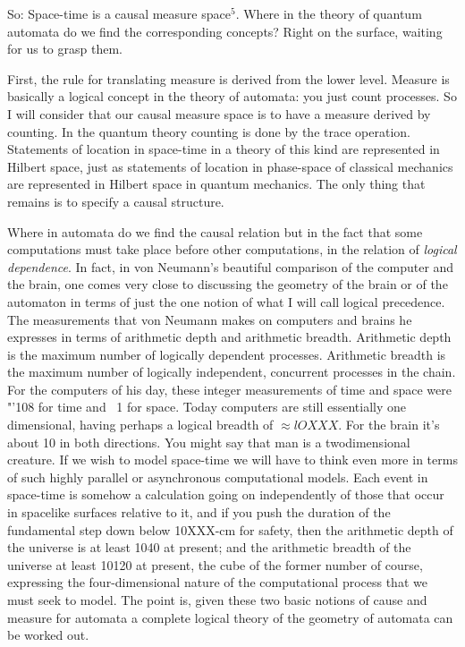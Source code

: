 So: Space-time is a causal measure space$^5$. Where in the theory of quantum automata
do we find the corresponding concepts? Right on the surface, waiting for us to
grasp them.

First, the rule for translating measure is derived from the lower level. Measure
is basically a logical concept in the theory of automata: you just count
processes. So I will consider that our causal measure space is to have a measure
derived by counting. In the quantum theory counting is done by the trace
operation. Statements of location in space-time in a theory of this kind are
represented in Hilbert space, just as statements of location in phase-space of
classical mechanics are represented in Hilbert space in quantum mechanics. The
only thing that remains is to specify a causal structure.

Where in automata do we find the causal relation but in the fact that some
computations must take place before other computations, in the relation of
\emph{logical dependence}. In fact, in von Neumann's beautiful comparison of the
computer and the brain, one comes very close to discussing the geometry of the
brain or of the automaton in terms of just the one notion of what I will call
logical precedence. The measurements that von Neumann makes on computers and
brains he expresses in terms of arithmetic depth and arithmetic breadth.
Arithmetic depth is the maximum number of logically dependent processes.
Arithmetic breadth is the maximum number of logically independent, concurrent
processes in the chain. For the computers of his day, these integer measurements
of time and space were "'108 for time and ~1 for space. Today computers are still
essentially one dimensional, having perhaps a logical breadth of $\approx lOXXX$. For the
brain it's about 10 in both directions. You might say that man is a
two­dimensional creature. If we wish to model space-time we will have to think
even more in terms of such highly parallel or asynchronous computational models.
Each event in space-time is somehow a calculation going on independently of those
that occur in spacelike surfaces relative to it, and if you push the duration of
the fundamental step down below 10XXX-cm for safety, then the arithmetic depth of
the universe is at least 1040 at present; and the arithmetic breadth of the
universe at least 10120 at present, the cube of the former number of course,
expressing the four-dimensional nature of the computational process that we must
seek to model. The point is, given these two basic notions of cause and measure
for automata a complete logical theory of the geometry of automata can be worked
out.

